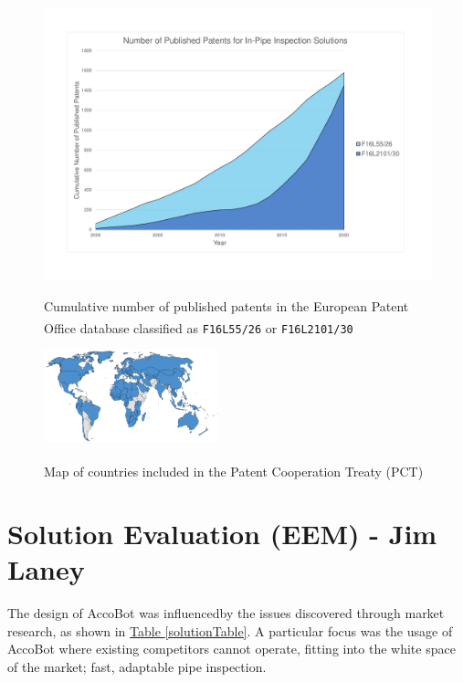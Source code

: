 \documentclass[11pt]{article}		%
\newlength{\imageheight}	 %
\newcommand{\supercite}[1]{\textsuperscript{\cite{#1}}}		%
\newcommand{\tableref}[1]{\hyperref[#1]{Table \ref*{#1}}}     %
\begin{document}
		\begin{figure}[h]
			\centering
			\begin{multicols}{2}
				\includegraphics[height=\imageheight]{patentGraph}
				\caption{Cumulative number of published patents in the European Patent Office database classified as \texttt{F16L55/26}\supercite{patent26} or \texttt{F16L2101/30}\supercite{patent30}}
				\label{patentGraph}
				\columnbreak
				\includegraphics[width=0.45\textwidth]{pctMap}
				\caption{Map of countries included in the Patent Cooperation Treaty (PCT)\supercite{pct2020states}}
				\label{pctMap}
			\end{multicols}
		\end{figure}
	
	\section[Solution Evaluation - EEM]{Solution Evaluation (EEM) - Jim Laney} \label{solutionEvaluation}
	
		The design of AccoBot was influencedby the issues discovered through market research, as shown in \tableref{solutionTable}.
		A particular focus was the usage of AccoBot where existing competitors cannot operate, fitting into the white space of the market; fast, adaptable pipe inspection.
		
\end{document}
